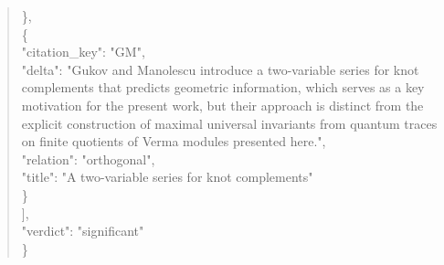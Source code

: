 \documentclass[11pt]{article}
\begin{document}
\begin{quote}
    \},\\
    \{\\
      "citation\_key": "GM",\\
      "delta": "Gukov and Manolescu introduce a two-variable series for knot complements that predicts geometric information, which serves as a key motivation for the present work, but their approach is distinct from the explicit construction of maximal universal invariants from quantum traces on finite quotients of Verma modules presented here.",\\
      "relation": "orthogonal",\\
      "title": "A two-variable series for knot complements"\\
    \}\\
  ],\\
  "verdict": "significant"\\
\}\\
\end{quote}
\end{document}
